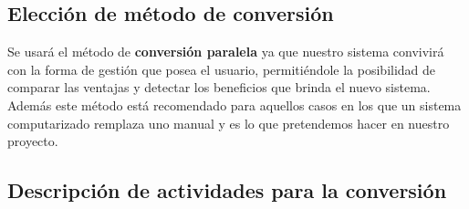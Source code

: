 \subsection{Elección de método de conversión}

Se usará el método de \textbf{conversión paralela} ya que nuestro sistema convivirá con la forma de gestión que posea el usuario, permitiéndole la posibilidad  de comparar las ventajas y detectar los beneficios que brinda el nuevo sistema.
Además este método está recomendado para aquellos casos en los que un sistema computarizado remplaza uno manual y es lo que pretendemos hacer en nuestro proyecto.

\subsection{Descripción de actividades para la conversión}


